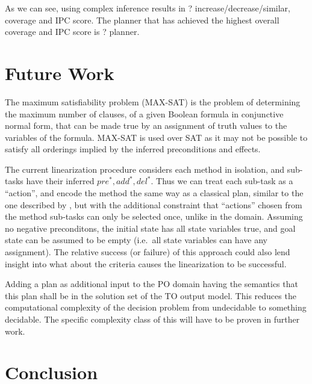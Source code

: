 \documentclass[letterpaper]{article} %
\newcommand{\PreS} {\ensuremath{\mathit{pre^{*}}}}
\newcommand{\AddS} {\ensuremath{\mathit{add^{*}}}}
\newcommand{\DelS} {\ensuremath{\mathit{del^{*}}}}
\begin{document}
As we can see, using complex inference results in ?  increase/decrease/similar, coverage and IPC score.
The planner that has achieved the highest overall coverage and IPC score is ? planner.




\section{Future Work}
The maximum satisfiability problem (MAX-SAT) is the problem of determining the maximum number of clauses, of a given Boolean formula in conjunctive normal form, that can be made true by an assignment of truth values to the variables of the formula. MAX-SAT is used over SAT as it may not be possible to satisfy all orderings implied by the inferred preconditions and effects.

The current linearization procedure considers each method in isolation, and sub-tasks have their inferred $\PreS, \AddS, \DelS$. Thus we can treat each sub-task as a \enquote{action}, and encode the method the same way as a classical plan, similar to the one described by \cite{RINTANEN201245}, but with the additional constraint that \enquote{actions} chosen from the method sub-tasks can only be selected once, unlike in the domain. Assuming no negative preconditons, the initial state has all state variables true, and goal state can be assumed to be empty (i.e.\ all state variables can have any assignment). The relative success (or failure) of this approach could also lend insight into what about the criteria causes the linearization to be successful.


Adding a plan as additional input to the PO domain having the
semantics that this plan shall be in the solution set of the TO output
model. This reduces the computational complexity of the decision problem from undecidable to something decidable. The specific complexity class of this will have to be proven in further work.  %





\section{Conclusion}

\end{document}
